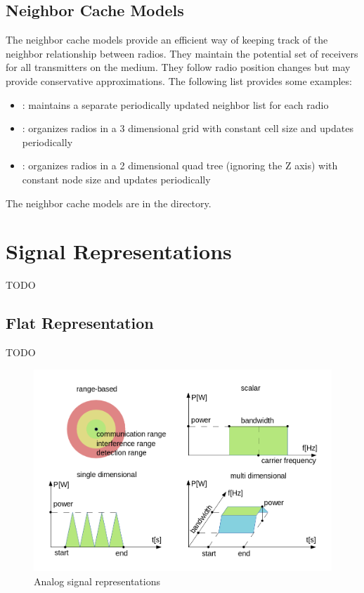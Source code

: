 \subsection{Neighbor Cache Models}

The neighbor cache models provide an efficient way of keeping track of the neighbor
relationship between radios. They maintain the potential set of receivers for all
transmitters on the medium. They follow radio position changes but may provide
conservative approximations. The following list provides some examples:

\begin{itemize}
  \item {}: maintains a separate periodically updated 
neighbor list for each radio
  \item {}: organizes radios in a 3 dimensional grid
with constant cell size and updates periodically
  \item {}: organizes radios in a 2 dimensional
quad tree (ignoring the Z axis) with constant node size and updates periodically
\end{itemize}

The neighbor cache models are in the 
directory.

\section{Signal Representations}

TODO

\subsection{Flat Representation}

TODO

\begin{center}
\begin{figure}
\includegraphics[width=\textwidth]{figures/phyanalog}
\caption{Analog signal representations}
\end{figure}
\end{center}

